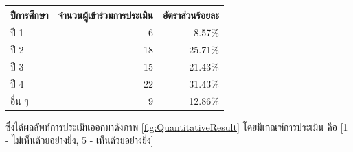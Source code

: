 \begin{enumerate}
\begin{table}[H]
              \label{tab:UserRatio}
              \begin{tabular}{|l|r|r|}
                  \hline
                  \textbf{ปีการศึกษา} & \multicolumn{1}{l|}{\textbf{จำนวนผู้เข้าร่วมการประเมิน}} & \multicolumn{1}{l|}{\textbf{อัตราส่วนร้อยละ}} \\ \hline
                  ปี 1               & 6                                                  & 8.57\%                                     \\ \hline
                  ปี 2               & 18                                                 & 25.71\%                                    \\ \hline
                  ปี 3               & 15                                                 & 21.43\%                                    \\ \hline
                  ปี 4               & 22                                                 & 31.43\%                                    \\ \hline
                  อื่น ๆ              & 9                                                  & 12.86\%                                    \\ \hline
              \end{tabular}
          \end{table}
          \par{ซึ่งได้ผลลัพท์การประเมินออกมาดังภาพ \ref{fig:QuantitativeResult} โดยมีเกณฑ์การประเมิน คือ [1 - ไม่เห็นด้วยอย่างยิ่ง, 5 - เห็นด้วยอย่างยิ่ง]}
          \begin{figure}[H]\centering

\end{figure}
\end{enumerate}
